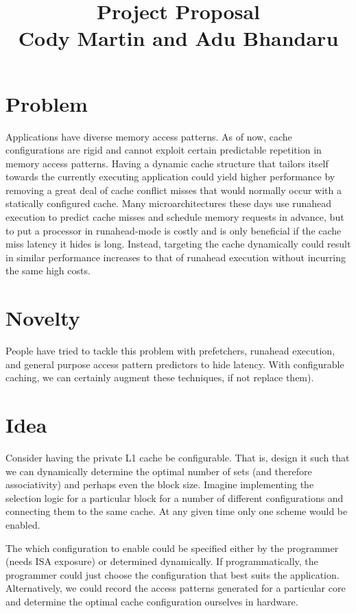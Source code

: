 \documentclass[pageno]{jpaper}
\begin{document}
\title{\textbf{Project Proposal}\\Cody Martin and Adu Bhandaru}

\date{}
\maketitle

\thispagestyle{empty}

\section{Problem}
Applications have diverse memory access patterns. As of now, cache configurations are rigid and cannot exploit certain predictable repetition in memory access patterns. Having a dynamic cache structure that tailors itself towards the currently executing application could yield higher performance by removing a great deal of cache conflict misses that would normally occur with a statically configured cache.  Many microarchitectures these days use runahead execution to predict cache misses and schedule memory requests in advance, but to put a processor in runahead-mode is costly and is only beneficial if the cache miss latency it hides is long. Instead, targeting the cache dynamically could result in similar performance increases to that of runahead execution without incurring the same high costs.

\section{Novelty}
People have tried to tackle this problem with prefetchers, runahead execution, and general purpose access pattern predictors to hide latency. With configurable caching, we can certainly augment these techniques, if not replace them).

\section{Idea}
Consider having the private L1 cache be configurable. That is, design it such that we can dynamically determine the optimal number of sets (and therefore associativity) and perhaps even the block size. Imagine implementing the selection logic for a particular block for a number of different configurations and connecting them to the same cache. At any given time only one scheme would be enabled.

The which configuration to enable could be specified either by the programmer (needs ISA exposure) or determined dynamically. If programmatically, the programmer could just choose the configuration that best suits the application. Alternatively, we could record the access patterns generated for a particular core and determine the optimal cache configuration ourselves in hardware.
\end{document}
